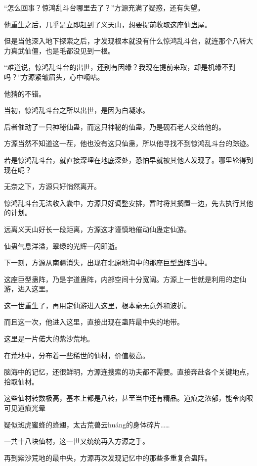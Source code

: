 
\begin{this_body}

“怎么回事？惊鸿乱斗台哪里去了？”方源充满了疑惑，还有失望。

他重生之后，几乎是立即赶到了义天山，想要提前收取这座仙蛊屋。

但是当他深入地下探索之后，才发现根本就没有什么惊鸿乱斗台，就连那个八转大力真武仙僵，也是毛都没见到一根。

“难道说，惊鸿乱斗台的出世，还别有因缘？我现在提前来取，却是机缘不到吗？”方源紧皱眉头，心中嘀咕。

他猜的不错。

当初，惊鸿乱斗台之所以出世，是因为白凝冰。

后者催动了一只神秘仙蛊，而这只神秘的仙蛊，乃是砚石老人交给他的。

方源当然不知道这一茬，他也没有这只仙蛊，所以他寻找不到惊鸿乱斗台的踪迹。

若是惊鸿乱斗台，就直接深埋在地底深处，恐怕早就被其他人发现了。哪里轮得到现在呢？

无奈之下，方源只好悄然离开。

惊鸿乱斗台无法收入囊中，方源只好调整安排，暂时将其搁置一边，先去执行其他的计划。

远离义天山好长一段距离，方源这才谨慎地催动仙蛊定仙游。

仙蛊气息洋溢，翠绿的光辉一闪即逝。

下一刻，方源从南疆消失，出现在北原地沟中的那座巨型蛊阵当中。

这座巨型蛊阵，乃是宇道蛊阵，内部空间十分宽阔。方源上一世就是利用的定仙游，进入这里。

这一世重生了，再用定仙游进入这里，根本毫无意外和波折。

而且这一次，他进入这里，直接出现在蛊阵最中央的地带。

这里是一片偌大的紫沙荒地。

在荒地中，分布着一些稀世的仙材，价值极高。

脑海中的记忆，还很鲜明，方源连搜索的功夫都不需要。直接奔赴各个关键地点，拾取仙材。

这些仙材转数极高，基本上都是八转，甚至当中还有精品。道痕之浓郁，能令肉眼可见道痕光晕

疑似斑虎蜜蜂的蜂翅，太古荒兽云huáng的身体碎片……

一共十八块仙材，这一世又统统再入方源之手。

再到紫沙荒地的最中央，方源再次发现记忆中的那些多重复合蛊阵。


\end{this_body}
